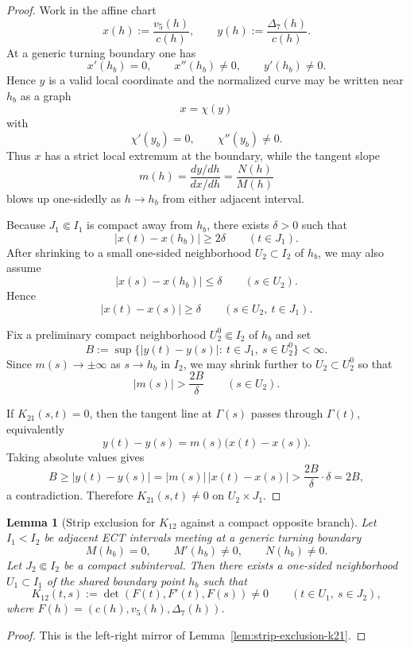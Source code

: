 \documentclass[11pt,a4paper]{amsart}
\theoremstyle{plain}
\newtheorem{lemma}[theorem]{Lemma}
\theoremstyle{definition}
\begin{document}
\begin{proof}
Work in the affine chart
\[
x(h):=\frac{v_5(h)}{c(h)},
\qquad
y(h):=\frac{\Delta_7(h)}{c(h)}.
\]
At a generic turning boundary one has
\[
x'(h_b)=0,\qquad x''(h_b)\neq 0,\qquad y'(h_b)\neq 0.
\]
Hence $y$ is a valid local coordinate and the normalized curve may be written
near $h_b$ as a graph
\[
x=\chi(y)
\]
with
\[
\chi'(y_b)=0,\qquad \chi''(y_b)\neq 0.
\]
Thus $x$ has a strict local extremum at the boundary, while the tangent slope
\[
m(h)=\frac{dy/dh}{dx/dh}=\frac{N(h)}{M(h)}
\]
blows up one-sidedly as $h\to h_b$ from either adjacent interval.

Because $J_1\Subset I_1$ is compact away from $h_b$, there exists
$\delta>0$ such that
\[
|x(t)-x(h_b)|\ge 2\delta
\qquad
(t\in J_1).
\]
After shrinking to a small one-sided neighborhood $U_2\subset I_2$ of $h_b$,
we may also assume
\[
|x(s)-x(h_b)|\le \delta
\qquad
(s\in U_2).
\]
Hence
\[
|x(t)-x(s)|\ge \delta
\qquad
(s\in U_2,\ t\in J_1).
\]

Fix a preliminary compact neighborhood $U_2^0\Subset I_2$ of $h_b$ and set
\[
B:=\sup\{|y(t)-y(s)|:\ t\in J_1,\ s\in U_2^0\}<\infty.
\]
Since $m(s)\to \pm\infty$ as $s\to h_b$ in $I_2$, we may shrink further to
$U_2\subset U_2^0$ so that
\[
|m(s)|>\frac{2B}{\delta}
\qquad
(s\in U_2).
\]

If $K_{21}(s,t)=0$, then the tangent line at $\Gamma(s)$ passes through
$\Gamma(t)$, equivalently
\[
y(t)-y(s)=m(s)\bigl(x(t)-x(s)\bigr).
\]
Taking absolute values gives
\[
B\ge |y(t)-y(s)|=|m(s)|\,|x(t)-x(s)|>\frac{2B}{\delta}\cdot \delta=2B,
\]
a contradiction. Therefore $K_{21}(s,t)\neq 0$ on $U_2\times J_1$.
\end{proof}

\begin{lemma}[Strip exclusion for $K_{12}$ against a compact opposite branch]
\label{lem:strip-exclusion-k12}
Let $I_1<I_2$ be adjacent ECT intervals meeting at a generic turning boundary
\[
M(h_b)=0,\qquad M'(h_b)\neq 0,\qquad N(h_b)\neq 0.
\]
Let $J_2\Subset I_2$ be a compact subinterval. Then there exists a one-sided
neighborhood $U_1\subset I_1$ of the shared boundary point $h_b$ such that
\[
K_{12}(t,s):=\det(F(t),F'(t),F(s))\neq 0
\qquad
(t\in U_1,\ s\in J_2),
\]
where $F(h)=(c(h),v_5(h),\Delta_7(h))$.
\end{lemma}

\begin{proof}
This is the left-right mirror of Lemma~\ref{lem:strip-exclusion-k21}.
\end{proof}
\end{document}
